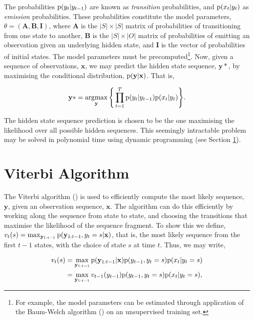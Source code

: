 The probabilities $\text{p}(y_t | y_{t-1})$ are known as \emph{transition} probabilities, and $\text{p}(x_t | y_t) $ as \emph{emission} probabilities. These probabilities constitute the model parameters, $\theta = (\mathbf{A}, \mathbf{B}, \mathbf{I})$, where $\mathbf{A}$ is the $|S| \times |S|$ matrix of probabilities of transitioning from one state to another, $\mathbf{B}$ is the $|S| \times |O|$ matrix of probabilities of emitting an observation given an underlying hidden state, and $\mathbf{I}$ is the vector of probabilities of initial states. The model parameters must be precomputed\footnote{For example, the model parameters can be estimated through application of the Baum-Welch algorithm (\cite{baum1966statistical}) on an unsupervised training set.}. Now, given a sequence of observations, $\textbf{x}$, we may predict the hidden state sequence, $\mathbf{y}*$, by maximising the conditional distribution, $\text{p}(\mathbf{y} | \mathbf{x})$. That is,

\begin{equation}
\textbf{y}* = \operatorname*{\arg\!\max}_{\textbf{y}}\Bigg\{\prod_{t=1}^T \text{p}(y_t | y_{t-1})\text{p}(x_t | y_t)\Bigg\}.
\label{eq:argmax}
\end{equation}

The hidden state sequence prediction is chosen to be the one maximising the likelihood over all possible hidden sequences. This seemingly intractable problem may be solved in polynomial time using dynamic programming (see Section \ref{sec:viterbi}).

\section{Viterbi Algorithm}
\label{sec:viterbi}

The Viterbi algorithm (\cite{viterbi1967error}) is used to efficiently compute the most likely sequence, $\textbf{y}$, given an observation sequence, $\textbf{x}$. The algorithm can do this efficiently by working along the sequence from state to state, and choosing the transitions that maximise the likelihood of the sequence fragment. To show this we define, $v_t(s) = \max_{\mathbf{y}_{1:t-1}} \text{p}(\mathbf{y}_{1:t-1}, y_t = s | \mathbf{x})$, that is, the most likely sequence from the first $t-1$ states, with the choice of state $s$ at time $t$. Thus, we may write,

\begin{equation}
\begin{aligned}
v_t(s) &= \max_{\mathbf{y}_{1:t-1}} \text{p}(\mathbf{y}_{1:t-1} | \mathbf{x}) \text{p}(y_{t-1}, y_t = s) \text{p}(x_t | y_t = s) \\
&= \max_{\mathbf{y}_{1:t-1}} v_{t-1}(y_{t-1}) \text{p}(y_{t-1}, y_t = s) \text{p}(x_t | y_t = s), 
\end{aligned}
\label{eq:viterbi}
\end{equation}

